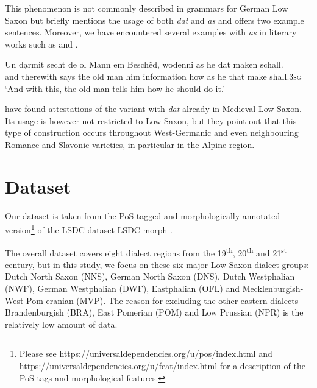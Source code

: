 \documentclass[output=paper,colorlinks,citecolor=brown]{langscibook}
\begin{document}
This phenomenon is not commonly described in grammars for German Low Saxon but \citet[289, 330]{Saltveit1983}  briefly mentions the usage of both \textit{dat} and \textit{as} and offers two example sentences.
Moreover, we have encountered several examples with \textit{as} in literary works such as \citet{Wisser1921} and \citet{Peters1986}.

\ea
 \gll  Un dạrmit secht de ol Mann em Beschêd, wodenni as he dat maken schall.\\
     and   therewith   says  the   old   man  him  information    how    as    he   that    make       shall.\textsc{3sg}\\
\glt `And with this, the old man tells him how he should do it.' \citep[29]{Wisser1921}
\z


\citet{SchallertEtAl2018} have found attestations of the variant with \textit{dat} already in Medieval Low Saxon. Its usage is however not restricted to Low Saxon, but  they point out that this type of construction occurs throughout West-Germanic and even neighbouring Romance and Slavonic varieties, in particular in the Alpine region. 


\section{Dataset}

Our dataset is taken from the PoS-tagged and morphologically annotated version\footnote{Please see \url{https://universaldependencies.org/u/pos/index.html} and \url{https://universaldependencies.org/u/feat/index.html} for a description of the PoS tags and morphological features.} of the LSDC dataset LSDC-morph \citep{SiewertEtAl2022}. %

\begin{sloppypar}
The overall dataset covers eight dialect regions from the 19\textsuperscript{th}, 20\textsuperscript{th} and 21\textsuperscript{st} century, but in this study, we focus on these six major Low Saxon dialect groups: Dutch North Saxon (NNS), German North Saxon (DNS), Dutch Westphalian (NWF), German Westphalian (DWF), Eastphalian (OFL) and Mecklenburgish-West Pom\hyp eranian (MVP). The reason for excluding the other eastern dialects Brandenburgish (BRA), East Pomerian (POM) and Low Prussian (NPR) is the relatively low amount of data.
\end{sloppypar}
\end{document}
